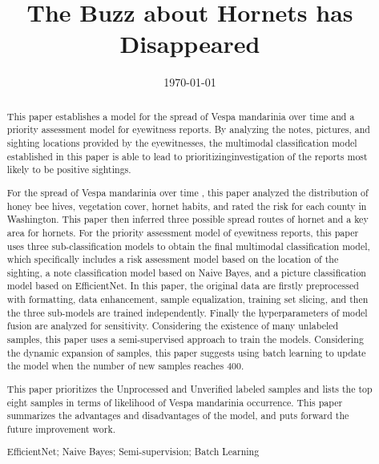 \documentclass{mcmthesis}
\title{\large The Buzz about Hornets  has Disappeared}
\author{}
\date{\today}
\numberwithin{figure}{section}
\numberwithin{table}{section}
\begin{document}
\begin{abstract}
  This paper establishes a model for the spread of Vespa mandarinia over time and a priority assessment model for eyewitness reports. By analyzing the notes, pictures, and sighting locations provided by the eyewitnesses, the multimodal classification model established in this paper is able to lead to prioritizinginvestigation of the reports most likely to be positive sightings.
  
  For the spread of Vespa mandarinia over time , this paper analyzed the distribution of honey bee hives, vegetation cover, hornet habits, and rated the risk for each county in Washington. This paper then inferred three possible spread routes of hornet and a key area for hornets. For the priority assessment model of eyewitness reports, this paper uses three sub-classification models to obtain the final multimodal classification model, which specifically includes a risk assessment model based on the location of the sighting, a note classification model based on Naive Bayes, and a picture classification model based on EfficientNet. In this paper, the original data are firstly preprocessed with formatting, data enhancement, sample equalization,  training set slicing, and then the three sub-models are trained independently. Finally the hyperparameters of model fusion are analyzed for sensitivity. Considering the existence of many unlabeled samples, this paper uses a semi-supervised approach to train the models. Considering the dynamic expansion of samples, this paper suggests using batch learning to update the model when the number of new samples reaches 400.
  
  This paper prioritizes the Unprocessed and Unverified labeled samples and lists the top eight samples in terms of likelihood of Vespa mandarinia occurrence. This paper summarizes the advantages and disadvantages of the model, and puts forward the future improvement work.
  
\begin{keywords}
EfficientNet; Naive Bayes; Semi-supervision; Batch Learning  

\end{keywords}
\end{abstract}
\maketitle
\pagestyle{empty}
\newpage                                                          %
\begin{adjustwidth}{-1cm}{0cm}

\setcounter{tocdepth}{3}
\thispagestyle{empty}
\tableofcontents                                                  %

\end{adjustwidth}
\end{document}
